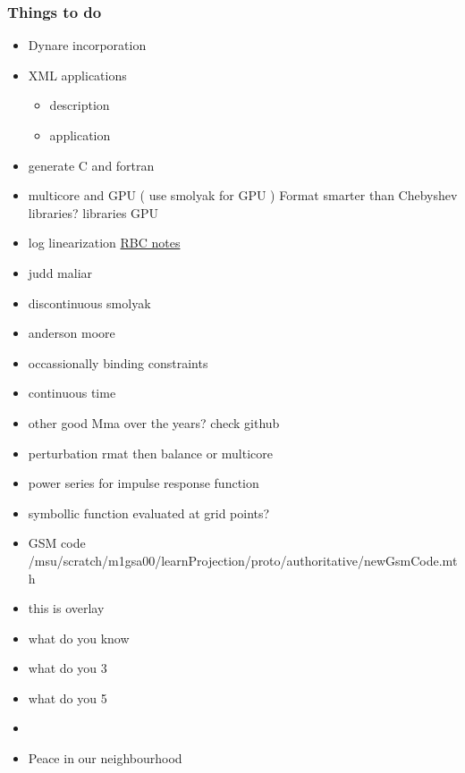 \documentclass{beamer}
\begin{document}
\begin{frame}
  \frametitle{Things to do}
  \begin{itemize}
\item Dynare incorporation
\item XML applications
  \begin{itemize}
  \item description
  \item application
  \end{itemize}
\item generate C and fortran
\item multicore and GPU ( use smolyak for GPU ) Format smarter than Chebyshev libraries?  libraries GPU
\item log linearization 
\href{http://web.mit.edu/14.452/www/pdf/rbc.pdf}{RBC notes}
\item judd maliar
\item discontinuous smolyak
\item anderson moore
\item occassionally binding constraints
\item continuous time
\item other good Mma over the years? check github
\item perturbation  rmat then balance or multicore
\item power series for impulse response function
\item symbollic function evaluated at grid points?
\item GSM code /msu/scratch/m1gsa00/learnProjection/proto/authoritative/newGsmCode.mth
\item<1>{this is overlay}
\item<2>{what do you know}
\item<3>{what do you 3}
\item<5>{what do you 5}
\end{itemize}
 \begin{itemize}
      \item{}
      \item<2-> Peace in our neighbourhood
    \end{itemize}
\end{frame}
\end{document}
